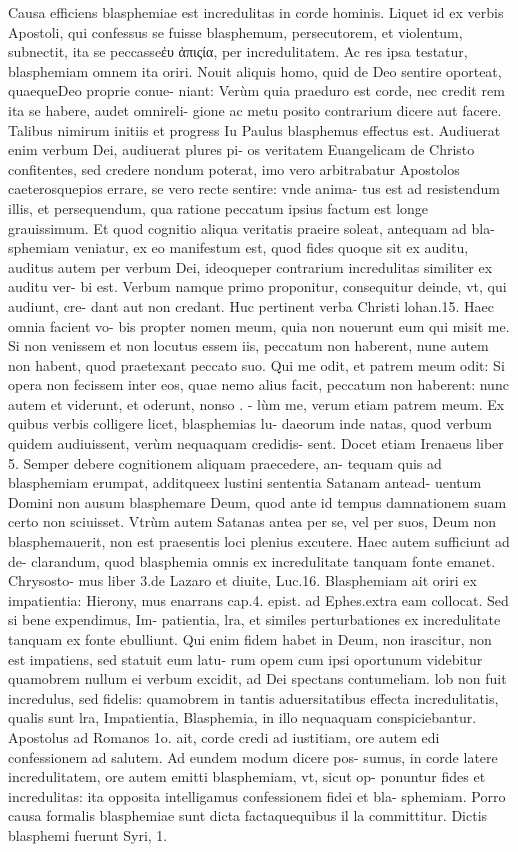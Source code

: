\documentclass{article}
\begin{document}
\begin{pages}
\marginpar{[ p.36 ]}\pstart Causa efficiens blasphemiae est incredulitas in corde hominis. Liquet id ex verbis Apostoli, qui confessus se fuisse blasphemum, persecutorem, et violentum, subnectit, ita se peccasseἐυ ἀπιςία, per incredulitatem. Ac res ipsa testatur, blasphemiam omnem ita oriri. Nouit aliquis homo, quid de Deo sentire oporteat, quaequeDeo proprie conue- niant: Verùm quia praeduro est corde, nec credit rem ita se habere, audet omnireli- gione ac metu posito contrarium dicere aut facere. Talibus nimirum initiis et progress Iu Paulus blasphemus effectus est. Audiuerat enim verbum Dei, audiuerat plures pi- os veritatem Euangelicam de Christo confitentes, sed credere nondum poterat, imo vero arbitrabatur Apostolos caeterosquepios errare, se vero recte sentire: vnde anima- tus est ad resistendum illis, et persequendum, qua ratione peccatum ipsius factum est longe grauissimum. Et quod cognitio aliqua veritatis praeire soleat, antequam ad bla- sphemiam veniatur, ex eo manifestum est, quod fides quoque sit ex auditu, auditus autem per verbum Dei, ideoqueper contrarium incredulitas similiter ex auditu ver- bi est. Verbum namque primo proponitur, consequitur deinde, vt, qui audiunt, cre- dant aut non credant. Huc pertinent verba Christi lohan.15. Haec omnia facient vo- bis propter nomen meum, quia non nouerunt eum qui misit me. Si non venissem et non locutus essem iis, peccatum non haberent, nune autem non habent, quod praetexant peccato suo. Qui me odit, et patrem meum odit: Si opera non fecissem inter eos, quae nemo alius facit, peccatum non haberent: nunc autem et viderunt, et oderunt, nonso . - lùm me, verum etiam patrem meum. Ex quibus verbis colligere licet, blasphemias lu-   daeorum inde natas, quod verbum quidem audiuissent, verùm nequaquam credidis- sent. Docet etiam Irenaeus liber 5. Semper debere cognitionem aliquam praecedere, an- tequam quis ad blasphemiam erumpat, additqueex lustini sententia Satanam antead- uentum Domini non ausum blasphemare Deum, quod ante id tempus damnationem suam certo non sciuisset. Vtrùm autem Satanas antea per se, vel per suos, Deum non blasphemauerit, non est praesentis loci plenius excutere. Haec autem sufficiunt ad de- clarandum, quod blasphemia omnis ex incredulitate tanquam fonte emanet. Chrysosto- mus liber 3.de Lazaro et diuite, Luc.16. Blasphemiam ait oriri ex impatientia: Hierony, mus enarrans cap.4. epist. ad Ephes.extra eam collocat. Sed si bene expendimus, Im- patientia, lra, et similes perturbationes ex incredulitate tanquam ex fonte ebulliunt. Qui enim fidem habet in Deum, non irascitur, non est impatiens, sed statuit eum latu- rum opem cum ipsi oportunum videbitur quamobrem nullum ei verbum excidit, ad Dei spectans contumeliam. lob non fuit incredulus, sed fidelis: quamobrem in tantis aduersitatibus effecta incredulitatis, qualis sunt lra, Impatientia, Blasphemia, in illo nequaquam conspiciebantur. Apostolus ad Romanos 1o. ait, corde credi ad iustitiam, ore autem edi confessionem ad salutem. Ad eundem modum dicere pos- sumus, in corde latere incredulitatem, ore autem emitti blasphemiam, vt, sicut op- ponuntur fides et incredulitas: ita opposita intelligamus confessionem fidei et bla- sphemiam. Porro causa formalis blasphemiae sunt dicta factaquequibus il la committitur. Dictis blasphemi fuerunt Syri, 1. 
\end{pages}
\end{document}
